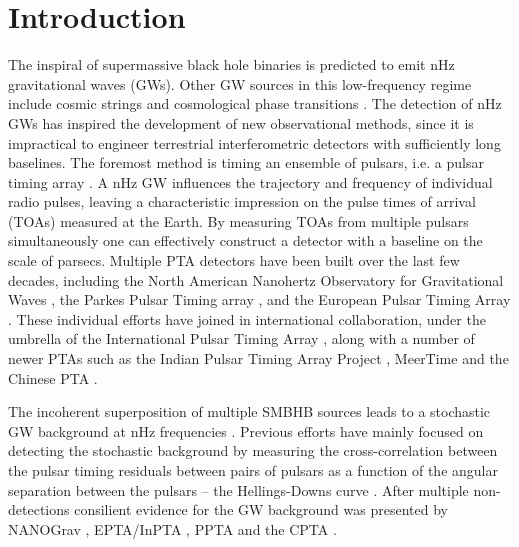 \documentclass[fleqn,usenatbib,useAMS]{mnras}
\begin{document}
\section{Introduction}\label{sec:intro}
The inspiral of supermassive black hole binaries \citep[SMBHBs;][]{Rajagopal1995,Jaffe_2003, Wyithe2003,Sesana2013,McWilliams_2014,Ravi2015MNRAS.447.2772R,Burke2019, Skyes2022} is predicted to emit nHz gravitational waves (GWs). Other GW sources in this low-frequency regime include cosmic strings \citep[e.g.][]{PTAstring} and cosmological phase transitions \citep[e.g.][]{PTAphase}. The detection of nHz GWs has inspired the development of new observational methods, since it is impractical to engineer terrestrial interferometric detectors with sufficiently long baselines. The foremost method is timing an ensemble of pulsars, i.e. a pulsar timing array \citep[PTA;][]{ Tiburzi2018, 2021hgwa.bookE...4V}. A nHz GW influences the trajectory and frequency of individual radio pulses, leaving a characteristic impression on the pulse times of arrival (TOAs) measured at the  Earth. By measuring TOAs from multiple pulsars simultaneously one can effectively construct a detector with a baseline on the scale of parsecs. Multiple PTA detectors have been built over the last few decades, including the North American Nanohertz Observatory for Gravitational Waves \citep[NANOGrav,][]{NANOgrav2023}, the Parkes Pulsar Timing array \citep[PPTA,][]{Parkes2023}, and the European Pulsar Timing Array \citep[EPTA,][]{EPTA2023}. These individual efforts have joined in international collaboration, under the umbrella of the International Pulsar Timing Array \citep[IPTA,][]{2019MNRAS.490.4666P}, along with a number of newer PTAs such as the Indian Pulsar Timing Array Project \citep[InPTA,][]{ipta}, MeerTime \citep{meertime2,Meertime} and the Chinese PTA \citep[CPTA,][]{Hobbs_2019}. \newline 

The incoherent superposition of multiple SMBHB sources leads to a stochastic GW background at nHz frequencies \citep{Allen1997,Sesana10,Christensen2019,Renzini2022}. Previous efforts have mainly focused on detecting the stochastic background by measuring the cross-correlation between the pulsar timing residuals between pairs of pulsars as a function of the angular separation between the pulsars -- the Hellings-Downs curve \citep{Hellings}. After multiple non-detections \citep{Lentati2015,NanoGrav2018,2022MNRAS.510.4873A} consilient evidence for the GW background was presented by NANOGrav \citep{2023ApJ...951L...8A}, EPTA/InPTA \citep{2023arXiv230616214A}, PPTA \citep{2023ApJ...951L...6R} and the CPTA \citep{2023RAA....23g5024X}. \newline 
\end{document}
